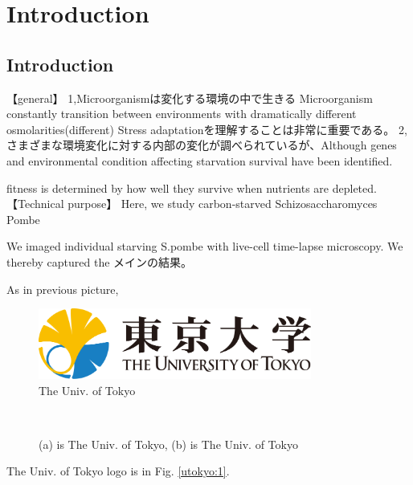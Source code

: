 \chapter{Introduction}
\section{Introduction}
【general】
1,Microorganismは変化する環境の中で生きる
Microorganism constantly transition between environments with dramatically different osmolarities(different)
Stress adaptationを理解することは非常に重要である。
2,さまざまな環境変化に対する内部の変化が調べられているが、Although genes and environmental condition affecting starvation survival have been identified.

fitness is determined by how well they survive when nutrients are depleted.
【Technical purpose】
Here, we study carbon-starved {Schizosaccharomyces Pombe}

We imaged individual starving {S.pombe} with live-cell time-lapse microscopy.
We thereby captured the メインの結果。

As in previous picture, 
\begin{figure}[htbp]
\centerline{\includegraphics[width=0.8\textwidth]{figure/UTokyo_logo.png}}
\caption{The Univ. of Tokyo\cite{nonlinear}} 
\end{figure}

\begin{figure}[H]
  \centering
  \newcommand{\subfig}[2]{%
    \subfloat[]{\texttt{[image: \#1]}\label{#2}}%
  }
  \subfig{figure/UTokyo_logo.png}{utokyo:1} \\
  \subfig{figure/UTokyo_logo.png}{utokyo:2}

  \captionsetup{font=small}
  \caption{(a) is The Univ. of Tokyo, (b) is The Univ. of Tokyo}
  \label{utokyo}
\end{figure}

The Univ. of Tokyo logo is in Fig. \ref{utokyo:1}.

\begin{figure}[H]
  \centering
  \newcommand{\subfig}[2]{%
    \subfloat[]{\texttt{[image: \#1]}\label{#2}}%
  }
  \subfig{figure/UTokyo_logo.png}{utokyo:3} 
\end{figure}

